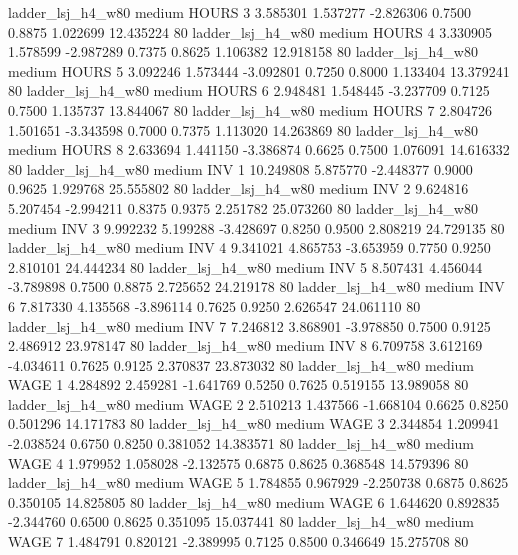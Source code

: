      ladder_lsj_h4_w80     medium    HOURS                 3  3.585301 1.537277 -2.826306 0.7500 0.8875  1.022699   12.435224 80
     ladder_lsj_h4_w80     medium    HOURS                 4  3.330905 1.578599 -2.987289 0.7375 0.8625  1.106382   12.918158 80
     ladder_lsj_h4_w80     medium    HOURS                 5  3.092246 1.573444 -3.092801 0.7250 0.8000  1.133404   13.379241 80
     ladder_lsj_h4_w80     medium    HOURS                 6  2.948481 1.548445 -3.237709 0.7125 0.7500  1.135737   13.844067 80
     ladder_lsj_h4_w80     medium    HOURS                 7  2.804726 1.501651 -3.343598 0.7000 0.7375  1.113020   14.263869 80
     ladder_lsj_h4_w80     medium    HOURS                 8  2.633694 1.441150 -3.386874 0.6625 0.7500  1.076091   14.616332 80
     ladder_lsj_h4_w80     medium      INV                 1 10.249808 5.875770 -2.448377 0.9000 0.9625  1.929768   25.555802 80
     ladder_lsj_h4_w80     medium      INV                 2  9.624816 5.207454 -2.994211 0.8375 0.9375  2.251782   25.073260 80
     ladder_lsj_h4_w80     medium      INV                 3  9.992232 5.199288 -3.428697 0.8250 0.9500  2.808219   24.729135 80
     ladder_lsj_h4_w80     medium      INV                 4  9.341021 4.865753 -3.653959 0.7750 0.9250  2.810101   24.444234 80
     ladder_lsj_h4_w80     medium      INV                 5  8.507431 4.456044 -3.789898 0.7500 0.8875  2.725652   24.219178 80
     ladder_lsj_h4_w80     medium      INV                 6  7.817330 4.135568 -3.896114 0.7625 0.9250  2.626547   24.061110 80
     ladder_lsj_h4_w80     medium      INV                 7  7.246812 3.868901 -3.978850 0.7500 0.9125  2.486912   23.978147 80
     ladder_lsj_h4_w80     medium      INV                 8  6.709758 3.612169 -4.034611 0.7625 0.9125  2.370837   23.873032 80
     ladder_lsj_h4_w80     medium     WAGE                 1  4.284892 2.459281 -1.641769 0.5250 0.7625  0.519155   13.989058 80
     ladder_lsj_h4_w80     medium     WAGE                 2  2.510213 1.437566 -1.668104 0.6625 0.8250  0.501296   14.171783 80
     ladder_lsj_h4_w80     medium     WAGE                 3  2.344854 1.209941 -2.038524 0.6750 0.8250  0.381052   14.383571 80
     ladder_lsj_h4_w80     medium     WAGE                 4  1.979952 1.058028 -2.132575 0.6875 0.8625  0.368548   14.579396 80
     ladder_lsj_h4_w80     medium     WAGE                 5  1.784855 0.967929 -2.250738 0.6875 0.8625  0.350105   14.825805 80
     ladder_lsj_h4_w80     medium     WAGE                 6  1.644620 0.892835 -2.344760 0.6500 0.8625  0.351095   15.037441 80
     ladder_lsj_h4_w80     medium     WAGE                 7  1.484791 0.820121 -2.389995 0.7125 0.8500  0.346649   15.275708 80
